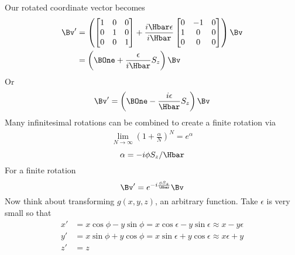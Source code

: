 Our rotated coordinate vector becomes
\begin{equation}\label{eqn:lecture12rotationsAndAngularMomentum:260}
\begin{aligned}
\Bv' &=
\left(
\begin{bmatrix}
1 & 0 & 0 \\
0 & 1 & 0 \\
0 & 0 & 1
\end{bmatrix}
+
\frac{i \Hbar \epsilon}{i\Hbar}
\begin{bmatrix}
0 &- 1 & 0 \\
1 & 0 & 0 \\
0 & 0 & 0
\end{bmatrix}
\right)
\Bv \\
&=
\left(
\BOne + \frac{\epsilon}{i \Hbar} S_z
\right)
\Bv
\end{aligned}
\end{equation}
%
Or
\begin{equation}\label{eqn:PHY356FDec7:70}
\begin{aligned}
\Bv'
=
\left(
\BOne - \frac{i \epsilon}{\Hbar} S_z
\right)
\Bv
\end{aligned}
\end{equation}
%
Many infinitesimal rotations can be combined to create a finite rotation via
\begin{equation}\label{eqn:PHY356FDec7:80}
\begin{aligned}
\lim_{N \rightarrow \infty} \left( 1 + \frac{\alpha}{N} \right)^N = e^\alpha
\end{aligned}
\end{equation}
%
\begin{equation}\label{eqn:PHY356FDec7:85}
\alpha = -i \phi S_z/\Hbar
\end{equation}
%
For a finite rotation
\begin{equation}\label{eqn:PHY356FDec7:90}
\Bv'
=
e^{ -i \frac{\phi S_z}{\Hbar} }
\Bv
\end{equation}
%
Now think about transforming \(g(x,y,z)\), an arbitrary function.  Take \(\epsilon\) is very small so that
%
\begin{equation}\label{eqn:PHY356FDec7:100}
\begin{aligned}
x' &= x \cos \phi - y \sin\phi = x \cos \epsilon - y \sin\epsilon \approx x - y \epsilon \\
y' &= x \sin \phi + y \cos\phi = x \sin \epsilon + y \cos\epsilon \approx x \epsilon + y \\
z' &= z
\end{aligned}
\end{equation}
%
